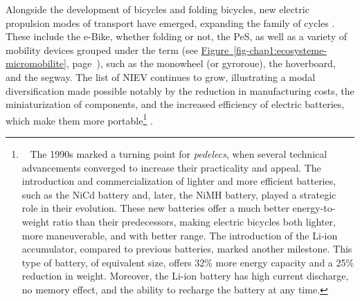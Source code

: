 \begin{refsegment}
Alongside the development of bicycles and folding bicycles, new electric propulsion modes of transport have emerged, expanding the family of cycles \textcolor{blue}{\autocite[5]{lopez-escolano_mobilites_2019}}. These include the \acrfull{e-Bike}, whether folding or not, the \acrfull{PeS}, as well as a variety of mobility devices grouped under the term  (see \hyperref[fig-chap1:ecosysteme-micromobilite]{Figure~\ref{fig-chap1:ecosysteme-micromobilite}}, page~\pageref{fig-chap1:ecosysteme-micromobilite}), such as the monowheel (or gyroroue), the hoverboard, and the segway. The list of \acrfull{NIEV} continues to grow, illustrating a modal diversification made possible notably by the reduction in manufacturing costs, the miniaturization of components, and the increased efficiency of electric batteries, which make them more portable\footnote{~
    The 1990s marked a turning point for \textsl{pedelecs}, when several technical advancements converged to increase their practicality and appeal. The introduction and commercialization of lighter and more efficient batteries, such as the \acrfull{NiCd} battery and, later, the \acrfull{NiMH} battery, played a strategic role in their evolution. These new batteries offer a much better energy-to-weight ratio than their predecessors, making electric bicycles both lighter, more maneuverable, and with better range. The introduction of the \acrfull{Li-ion} accumulator, compared to previous batteries, marked another milestone. This type of battery, of equivalent size, offers 32\% more energy capacity and a 25\% reduction in weight. Moreover, the \acrshort{Li-ion} battery has high current discharge, no memory effect, and the ability to recharge the battery at any time.
} \textcolor{blue}{\autocites[430]{bertoluzzo_development_2011}[2]{schultz_micromobility_2019}[430]{pages_nouveaux_2021}}.%


\end{refsegment}
